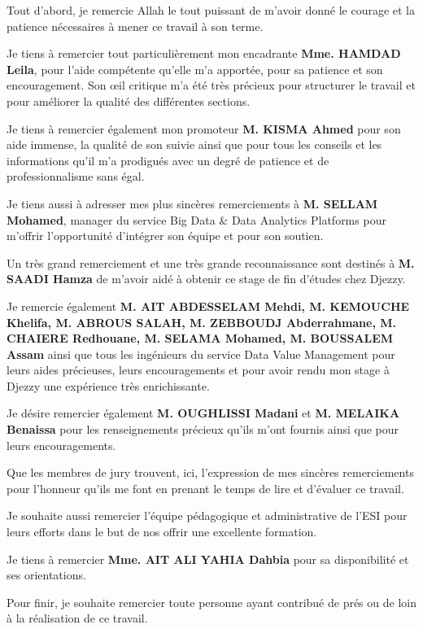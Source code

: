
Tout d'abord, je remercie Allah le tout puissant de m'avoir donné le courage et la patience nécessaires à mener ce travail à son terme.

Je tiens à remercier tout particulièrement mon encadrante \textbf{Mme. HAMDAD Leila}, pour l'aide compétente qu'elle m'a apportée, pour sa patience et son encouragement. Son œil critique m'a été très précieux pour structurer le travail et pour améliorer la qualité des différentes sections.

Je tiens à remercier également mon promoteur \textbf{M. KISMA Ahmed} pour son aide immense, la qualité de son suivie ainsi que pour tous les conseils et les informations qu'il m'a prodigués avec un degré de patience et de professionnalisme sans égal.

Je tiens aussi à adresser mes plus sincères remerciements à \textbf{M. SELLAM Mohamed}, manager du service Big Data \& Data Analytics Platforms pour m'offrir l'opportunité d'intégrer son équipe et pour son soutien.

Un très grand remerciement et une très grande reconnaissance sont destinés à \textbf{M. SAADI Hamza} de m'avoir aidé à obtenir ce stage de fin d'études chez Djezzy.

Je remercie également \textbf{M. AIT ABDESSELAM Mehdi, M. KEMOUCHE Khelifa, M. ABROUS SALAH, M. ZEBBOUDJ Abderrahmane, M. CHAIERE Redhouane, M. SELAMA Mohamed, M. BOUSSALEM Assam} ainsi que tous les ingénieurs du service Data Value Management pour leurs aides précieuses, leurs encouragements et pour avoir rendu mon stage à Djezzy une expérience très enrichissante.

Je désire remercier également \textbf{M. OUGHLISSI Madani} et \textbf{M. MELAIKA Benaissa} pour les renseignements précieux qu'ils m'ont fournis ainsi que pour leurs encouragements.

Que les membres de jury trouvent, ici, l'expression de mes sincères remerciements pour l'honneur qu'ils me font en prenant le temps de lire et d'évaluer ce travail.

Je souhaite aussi remercier l'équipe pédagogique et administrative de l'ESI pour leurs efforts dans le but de nos offrir une excellente formation.

Je tiens à remercier \textbf{Mme. AIT ALI YAHIA Dahbia} pour sa disponibilité et ses orientations.

Pour finir, je souhaite remercier toute personne ayant contribué de prés ou de loin à la réalisation de ce travail.






\clearpage